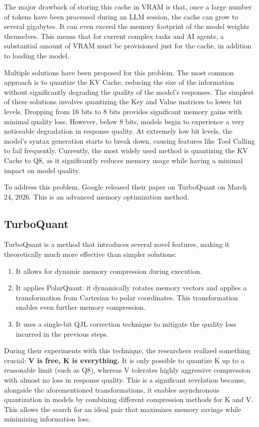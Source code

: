 \documentclass{article}
\begin{document}
The major drawback of storing this cache in VRAM is that, once a large number of tokens have been processed during an LLM session, the cache can grow to several gigabytes. It can even exceed the memory footprint of the model weights themselves. This means that for current complex tasks and AI agents, a substantial amount of VRAM must be provisioned just for the cache, in addition to loading the model.

Multiple solutions have been proposed for this problem. The most common approach is to quantize the KV Cache, reducing the size of the information without significantly degrading the quality of the model's responses.
The simplest of these solutions involves quantizing the Key and Value matrices to lower bit levels. Dropping from 16 bits to 8 bits provides significant memory gains with minimal quality loss. However, below 8 bits, models begin to experience a very noticeable degradation in response quality. At extremely low bit levels, the model's syntax generation starts to break down, causing features like Tool Calling to fail frequently.
Currently, the most widely used method is quantizing the KV Cache to Q8, as it significantly reduces memory usage while having a minimal impact on model quality.

To address this problem, Google released their paper on TurboQuant on March 24, 2026. This is an advanced memory optimization method.

\subsection{TurboQuant}
TurboQuant is a method that introduces several novel features, making it theoretically much more effective than simpler solutions:
\begin{enumerate}
  \item It allows for dynamic memory compression during execution.
  \item It applies PolarQuant: it dynamically rotates memory vectors and applies a transformation from Cartesian to polar coordinates. This transformation enables even further memory compression.
  \item It uses a single-bit QJL correction technique to mitigate the quality loss incurred in the previous steps.
\end{enumerate}
During their experiments with this technique, the researchers realized something crucial:
\textbf{V is free, K is everything.} It is only possible to quantize K up to a reasonable limit (such as Q8), whereas V tolerates highly aggressive compression with almost no loss in response quality. This is a significant revelation because, alongside the aforementioned transformations, it enables asynchronous quantization in models by combining different compression methods for K and V. This allows the search for an ideal pair that maximizes memory savings while minimizing information loss.
\end{document}
